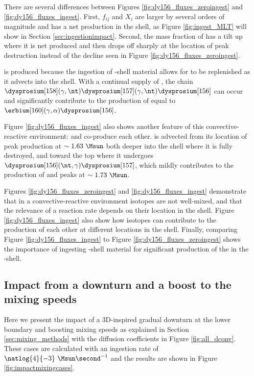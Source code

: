 There are several differences between Figures \ref{fig:dy156_fluxes_zeroingest} and \ref{fig:dy156_fluxes_ingest}.
First, $f_{ij}$ and $X_i$ are larger by several orders of magnitude and \dysprosium[156] has a net production in the shell, as Figure \ref{fig:ingest_MLT} will show in Section \ref{sec:ingestionimpact}.
Second, the mass fraction of \dysprosium[156] has a tilt up where it is net produced and then drops off sharply at the location of peak destruction instead of the decline seen in Figure \ref{fig:dy156_fluxes_zeroingest}.

\dysprosium[156] is produced because the ingestion of \carbon[]-shell material allows for \dysprosium[158] to be replenished as it advects into the shell.
With a continual supply of \dysprosium[158], the chain $\dysprosium[158](\gamma,\nt)\dysprosium[157](\gamma,\nt)\dysprosium[156]$ can occur and significantly contribute to the production of \dysprosium[156] equal to $\erbium[160](\gamma,\alpha)\dysprosium[156]$.

Figure \ref{fig:dy156_fluxes_ingest} also shows another feature of this convective-reactive environment: \dysprosium[156] and \dysprosium[157] co-produce each other. 
\dysprosium[156] is advected from its location of peak production at $\sim 1.63~\Msun$ both deeper into the shell where it is fully destroyed, and toward the top where it undergoes $\dysprosium[156](\nt,\gamma)\dysprosium[157]$, which mildly contributes to the production of \dysprosium[157] and peaks at $\sim 1.73~\Msun$.

Figures \ref{fig:dy156_fluxes_zeroingest} and \ref{fig:dy156_fluxes_ingest} demonstrate that in a convective-reactive environment isotopes are not well-mixed, and that the relevance of a reaction rate depends on their location in the shell.
Figure \ref{fig:dy156_fluxes_ingest} also show how isotopes can contribute to the production of each other at different locations in the shell.
Finally, comparing Figure \ref{fig:dy156_fluxes_ingest} to Figure \ref{fig:dy156_fluxes_zeroingest} shows the importance of ingesting \carbon[]-shell material for significant production of the \pnucn{} in the \oxygen[]-shell.

\subsection{Impact from a downturn and a boost to the mixing speeds}\label{sec:convdownturnimpact}

Here we present the impact of a 3D-inspired gradual downturn at the lower boundary and boosting mixing speeds as explained in Section \ref{sec:mixing_methods} with the diffusion coefficients in Figure \ref{fig:all_dconv}. 
These cases are calculated with an ingestion rate of $\natlog{4}{-3}~\Msun\second^{-1}$ and the results are shown in Figure \ref{fig:impactmixingcases}.


